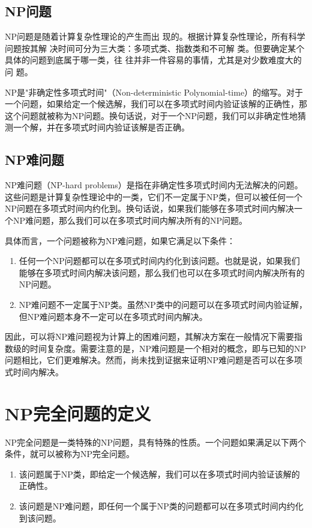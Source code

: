\documentclass[UTF8,openany,zihao=5]{ctexbook}
\begin{document}
\subsection{NP问题}
NP问题是随着计算复杂性理论的产生而出
现的。根据计算复杂性理论，所有科学问题按其解
决时间可分为三大类：多项式类、指数类和不可解
类。但要确定某个具体的问题到底属于哪一类，往
往并非一件容易的事情，尤其是对少数难度大的问
题。\cite{bi:DCF}

NP是"非确定性多项式时间"（Non-deterministic Polynomial-time）的缩写。对于一个问题，如果给定一个候选解，我们可以在多项式时间内验证该解的正确性，那这个问题就被称为NP问题。换句话说，对于一个NP问题，我们可以非确定性地猜测一个解，并在多项式时间内验证该解是否正确。

\subsection{NP难问题}
NP难问题（NP-hard problems）是指在非确定性多项式时间内无法解决的问题。这些问题是计算复杂性理论中的一类，它们不一定属于NP类，但可以被任何一个NP问题在多项式时间内约化到。换句话说，如果我们能够在多项式时间内解决一个NP难问题，那么我们可以在多项式时间内解决所有的NP问题。

具体而言，一个问题被称为NP难问题，如果它满足以下条件：
\begin{enumerate}[noitemsep]
  \item 任何一个NP问题都可以在多项式时间内约化到该问题。也就是说，如果我们能够在多项式时间内解决该问题，那么我们也可以在多项式时间内解决所有的NP问题。
  \item NP难问题不一定属于NP类。虽然NP类中的问题可以在多项式时间内验证解，但NP难问题本身不一定可以在多项式时间内解决。
\end{enumerate}

因此，可以将NP难问题视为计算上的困难问题，其解决方案在一般情况下需要指数级的时间复杂度。需要注意的是，NP难问题是一个相对的概念，即与已知的NP问题相比，它们更难解决。然而，尚未找到证据来证明NP难问题是否可以在多项式时间内解决。

\section{NP完全问题的定义}

NP完全问题是一类特殊的NP问题，具有特殊的性质。一个问题如果满足以下两个条件，就可以被称为NP完全问题。

\begin{enumerate}[noitemsep]
  \item 该问题属于NP类，即给定一个候选解，我们可以在多项式时间内验证该解的正确性。
  \item 该问题是NP难问题，即任何一个属于NP类的问题都可以在多项式时间内约化到该问题。
\end{enumerate}
\end{document}
